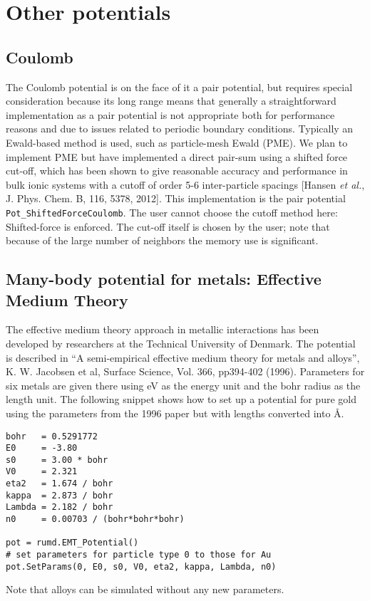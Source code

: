\documentclass[a4paper]{article}
\begin{document}
\section{Other potentials}

\subsection{Coulomb}

The Coulomb potential is on the face of it a pair potential, but requires special consideration because its long range means that generally a straightforward implementation as a pair potential is not appropriate both for performance reasons and due to issues related to periodic boundary conditions. Typically an Ewald-based method is used, such as particle-mesh Ewald (PME). We plan to implement PME but have implemented a direct pair-sum using a shifted force cut-off, which has been shown to give reasonable accuracy and performance in bulk ionic systems with a cutoff of order 5-6 inter-particle spacings [Hansen {\em et al.}, J. Phys. Chem. B, 116, 5378, 2012]. This implementation is the pair potential \verb|Pot_ShiftedForceCoulomb|. The user cannot choose the cutoff method here: Shifted-force is enforced. The cut-off itself is chosen by the user; note that because of the large number of neighbors the memory use is significant.

\subsection{Many-body potential for metals: Effective Medium Theory}

The effective medium theory approach in metallic interactions has been developed by researchers at the Technical University of Denmark. The potential is described in ``A semi-empirical effective medium theory for metals and alloys'', K. W. Jacobsen et al, Surface Science, Vol. 366, pp394-402 (1996). Parameters for six metals are given there using eV as the energy unit and the bohr radius as the length unit. The following snippet shows how to set up a potential for pure gold using the parameters from the 1996 paper but with lengths converted into \si{\angstrom}.

\begin{verbatim}
bohr   = 0.5291772
E0     = -3.80
s0     = 3.00 * bohr
V0     = 2.321
eta2   = 1.674 / bohr
kappa  = 2.873 / bohr
Lambda = 2.182 / bohr
n0     = 0.00703 / (bohr*bohr*bohr)

pot = rumd.EMT_Potential()
# set parameters for particle type 0 to those for Au
pot.SetParams(0, E0, s0, V0, eta2, kappa, Lambda, n0)

\end{verbatim}
Note that alloys can be simulated without any new parameters.
\end{document}
